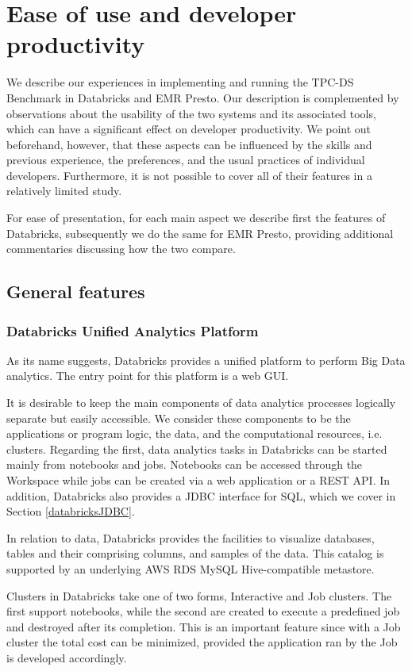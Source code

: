 \section{Ease of use and developer productivity}\label{usability}
We describe our experiences in implementing and running the TPC-DS Benchmark in Databricks and EMR Presto. Our description is complemented by observations about the usability of the two systems and its associated tools, which can have a significant effect on developer productivity. We point out beforehand, however, that these aspects can be influenced by the skills and previous experience, the preferences, and the usual practices of individual developers. Furthermore, it is not possible to cover all of their features in a relatively limited study.

For ease of presentation, for each main aspect we describe first the features of Databricks, subsequently we do the same for EMR Presto, providing additional commentaries discussing how the two compare.

\subsection{General features}
\subsubsection{Databricks Unified Analytics Platform}
As its name suggests, Databricks provides a unified platform to perform Big Data analytics. The entry point for this platform is a web GUI.

It is desirable to keep the main components of data analytics processes logically separate but easily accessible. We consider these components to be the applications or program logic, the data, and the computational resources, i.e. clusters. Regarding the first, data analytics tasks in Databricks can be started mainly from notebooks and jobs. Notebooks can be accessed through the Workspace while jobs can be created via a web application or a REST API. In addition, Databricks also provides a JDBC interface for SQL, which we cover in Section \ref{databricksJDBC}.

In relation to data, Databricks provides the facilities to visualize databases, tables and their comprising columns, and samples of the data. This catalog is supported by an underlying AWS RDS MySQL Hive-compatible metastore.

Clusters in Databricks take one of two forms, Interactive and Job clusters. The first support notebooks, while the second are created to execute a predefined job and destroyed after its completion. This is an important feature since with a Job cluster the total cost can be minimized, provided the application ran by the Job is developed accordingly.

